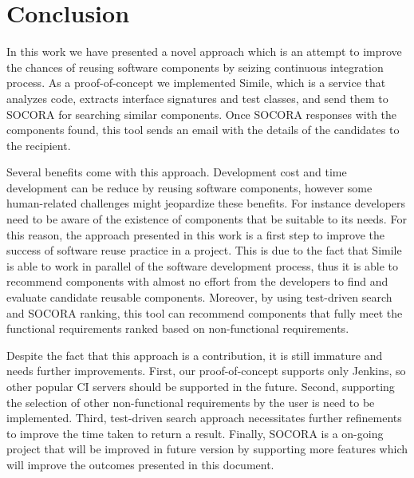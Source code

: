 \chapter{Conclusion}
\label{conclusion}
In this work we have presented a novel approach which is an attempt to improve the chances of reusing software components by seizing continuous integration process. As a proof-of-concept we implemented Simile, which is a service that analyzes code, extracts interface signatures and test classes, and send them to SOCORA for searching similar components. Once SOCORA responses with the components found, this tool sends an email with the details of the candidates to the recipient.

Several benefits come with this approach. Development cost and time development can be reduce by reusing software components, however some human-related challenges might jeopardize these benefits. For instance developers need to be aware of the existence of components that be suitable to its needs. For this reason, the approach presented in this work is a first step to improve the success of software reuse practice in a project. This is due to the fact that Simile is able to work in parallel of the software development process, thus it is able to recommend components with almost no effort from the developers to find and evaluate candidate reusable components. Moreover, by using test-driven search and SOCORA ranking, this tool can recommend components that fully meet the functional requirements ranked based on non-functional requirements.

Despite the fact that this approach is a contribution, it is still immature and needs further improvements. First, our proof-of-concept supports only Jenkins, so other popular CI servers should be supported in the future. Second, supporting the selection of other non-functional requirements by the user is need to be implemented. Third, test-driven search approach necessitates further refinements to improve the time taken to return a result. Finally, SOCORA is a on-going project that will be improved in future version by supporting more features which will improve the outcomes presented in this document.


